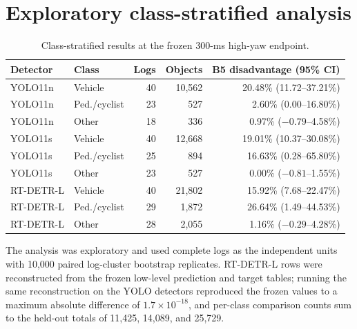 \documentclass[11pt]{article}
\begin{document}
\section{Exploratory class-stratified analysis}
\begin{table}[htbp]
\centering
\caption{Class-stratified results at the frozen 300-ms high-yaw endpoint.}
\small
\begin{tabular}{llrrr}
\toprule
Detector & Class & Logs & Objects & B5 disadvantage (95\% CI)\\
\midrule
YOLO11n & Vehicle & 40 & 10,562 & 20.48\% (11.72--37.21\%)\\
YOLO11n & Ped./cyclist & 23 & 527 & 2.60\% (0.00--16.80\%)\\
YOLO11n & Other & 18 & 336 & 0.97\% ($-0.79$--4.58\%)\\
YOLO11s & Vehicle & 40 & 12,668 & 19.01\% (10.37--30.08\%)\\
YOLO11s & Ped./cyclist & 25 & 894 & 16.63\% (0.28--65.80\%)\\
YOLO11s & Other & 23 & 527 & 0.00\% ($-0.81$--1.55\%)\\
RT-DETR-L & Vehicle & 40 & 21,802 & 15.92\% (7.68--22.47\%)\\
RT-DETR-L & Ped./cyclist & 29 & 1,872 & 26.64\% (1.49--44.53\%)\\
RT-DETR-L & Other & 28 & 2,055 & 1.16\% ($-0.29$--4.28\%)\\
\bottomrule
\end{tabular}
\end{table}
The analysis was exploratory and used complete logs as the independent units with 10,000 paired log-cluster bootstrap replicates. RT-DETR-L rows were reconstructed from the frozen low-level prediction and target tables; running the same reconstruction on the YOLO detectors reproduced the frozen values to a maximum absolute difference of $1.7\times10^{-18}$, and per-class comparison counts sum to the held-out totals of 11,425, 14,089, and 25,729.
\end{document}
